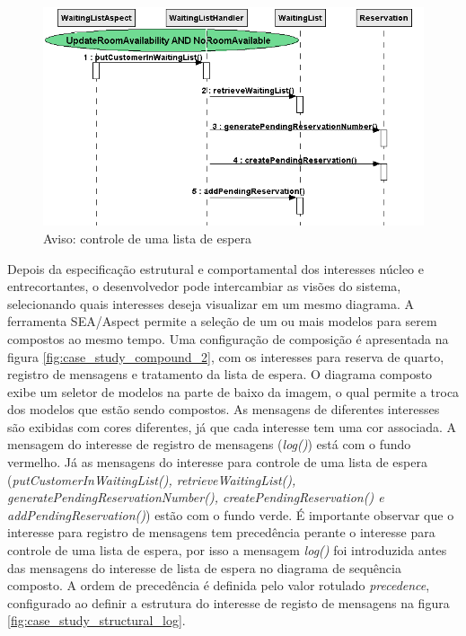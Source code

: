   \begin{figure}
	\centering
	\includegraphics{img/case_study_behavioral_waiting_list.png}
	\caption{Aviso: controle de uma lista de espera}\label{fig:case_study_behavioral_waiting_list}
  \end{figure}
  
Depois da especificação estrutural e comportamental dos interesses núcleo e entrecortantes, o desenvolvedor pode intercambiar as visões do sistema,
selecionando quais interesses deseja visualizar em um mesmo diagrama. A ferramenta SEA/Aspect permite a seleção de um ou mais modelos para serem
compostos ao mesmo tempo. Uma configuração de composição é apresentada na figura \ref{fig:case_study_compound_2}, com os interesses para reserva de
quarto, registro de mensagens e tratamento da lista de espera. O diagrama composto exibe um seletor de modelos na parte de baixo da imagem, o qual 
permite a troca dos modelos que estão sendo compostos. As mensagens de diferentes
interesses são exibidas com cores diferentes, já que cada interesse tem uma cor associada. A mensagem do interesse de registro de mensagens
(\textit{log()}) está com o fundo vermelho. Já as mensagens do interesse para controle de uma lista de espera (\textit{putCustomerInWaitingList(),
retrieveWaitingList(), generatePendingReservationNumber(), createPendingReservation() e addPendingReservation()}) estão com o fundo verde. É
importante observar que o interesse para registro de mensagens tem precedência perante o interesse para controle de uma lista de espera, por isso a
mensagem \textit{log()} foi introduzida antes das mensagens do interesse de lista de espera no diagrama de sequência composto. A ordem de
precedência é definida pelo valor rotulado \textit{precedence}, configurado ao definir a estrutura do interesse de registo de mensagens na figura
\ref{fig:case_study_structural_log}.

